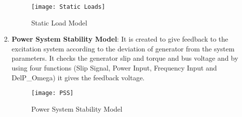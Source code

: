 \begin{enumerate}
	\begin{figure}[H]
	 \centering
	\texttt{[image: Static Loads]}
	\caption{Static Load Model}
	\label{Static Load Model}
	\end{figure}
	
%		
%		
%		

\item \textbf{\large Power System Stability Model}: It is created to give feedback to the excitation system according to the deviation of generator from the system parameters. It checks the generator slip and torque and bus voltage and by using four functions (Slip Signal, Power Input, Frequency Input and DelP\_Omega) it gives the feedback voltage.  
	
	\begin{figure}[H]
	 \centering
	\texttt{[image: PSS]}
	\caption{Power System Stability Model}
	\label{Power System Stability Model}
	\end{figure}
	

\end{enumerate}
